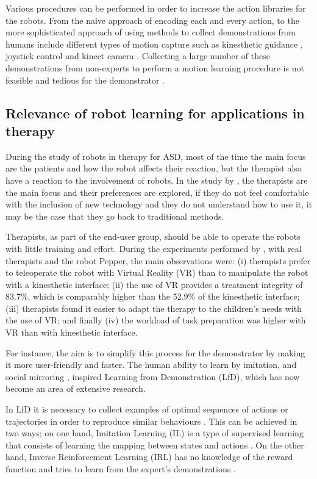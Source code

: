 \documentclass[thesis]{mas_proposal}
\begin{document}
    Various procedures can be performed in order to increase the action libraries for the robots. From the naive approach of encoding each and every action, to the more sophisticated approach of using methods to collect demonstrations from humans include different types of motion capture such as kinesthetic guidance \cite{Kronander2013}, joystick control \cite{Jiang2013} and kinect camera \cite{Assad2020}. Collecting a large number of these demonstrations from non-experts to perform a motion learning procedure is not feasible and tedious for the demonstrator \cite{Chen2022}.
    
	\subsection{Relevance of robot learning for applications in therapy}
    
    During the study of robots in therapy for ASD, most of the time the main focus are the patients and how the robot affects their reaction, but the therapist also have a reaction to the involvement of robots. In the study by \cite{Kulikovskiy2021}, the therapists are the main focus and their preferences are explored, if they do not feel comfortable with the inclusion of new technology and they do not understand how to use it, it may be the case that they go back to traditional methods.
    
    Therapists, as part of the end-user group, should be able to operate the robots with little training and effort. During the experiments performed by \cite{Kulikovskiy2021}, with real therapists and the robot Pepper, the main observations were: (i) therapists prefer to teleoperate the robot with Virtual Reality (VR) than to manipulate the robot with a kinesthetic interface; (ii) the use of VR provides a treatment integrity of 83.7\%, which is comparably higher than the 52.9\% of the kinesthetic interface; (iii) therapists found it easier to adapt the therapy to the children's needs with the use of VR; and finally (iv) the workload of task preparation was higher with VR than with kinesthetic interface. 
       
    For instance, the aim is to simplify this process for the demonstrator by making it more user-friendly and faster. The human ability to learn by imitation, and social mirroring \cite{Byrne2005}, inspired Learning from Demonstration (LfD), which has now become an area of extensive research.
    
    In LfD it is necessary to collect examples of optimal sequences of actions or trajectories in order to reproduce similar behaviours \cite{Piot2017}. This can be achieved in two ways; on one hand, Imitation Learning (IL) is a type of supervised learning that consists of learning the mapping between states and actions \cite{Dinyari2020}. On the other hand, Inverse Reinforcement Learning (IRL) has no knowledge of the reward function and tries to learn from the expert's demonstrations \cite{Reddy2019}.
    
\end{document}

